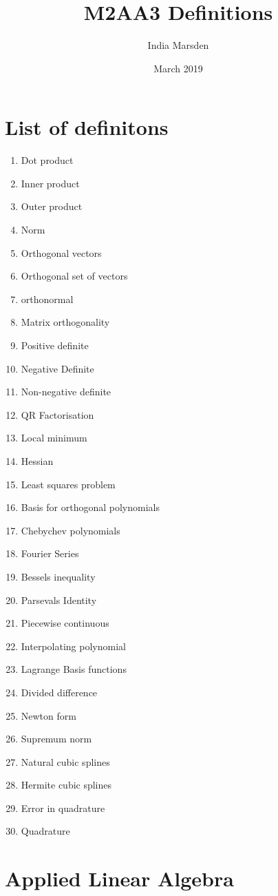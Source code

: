 \documentclass{article}
\title{M2AA3 Definitions}
\author{India Marsden }
\date{March 2019}
\begin{document}
\maketitle
\section*{List of definitons}
\begin{enumerate}
    \item Dot product
    \item Inner product
    \item Outer product
    \item Norm
    \item Orthogonal vectors
    \item Orthogonal set of vectors
    \item orthonormal
    \item Matrix orthogonality
    \item Positive definite
    \item Negative Definite
    \item Non-negative definite
    \item QR Factorisation
    \item Local minimum
    \item Hessian
    \item Least squares problem
    \item Basis for orthogonal polynomials
    \item Chebychev polynomials
    \item Fourier Series
    \item Bessels inequality
    \item Parsevals Identity
    \item Piecewise continuous
    \item Interpolating polynomial
    \item Lagrange Basis functions
    \item Divided difference
    \item Newton form
    \item Supremum norm
    \item Natural cubic splines
    \item Hermite cubic splines
    \item Error in quadrature
    \item Quadrature
\end{enumerate}
\section{Applied Linear Algebra}
\end{document}
